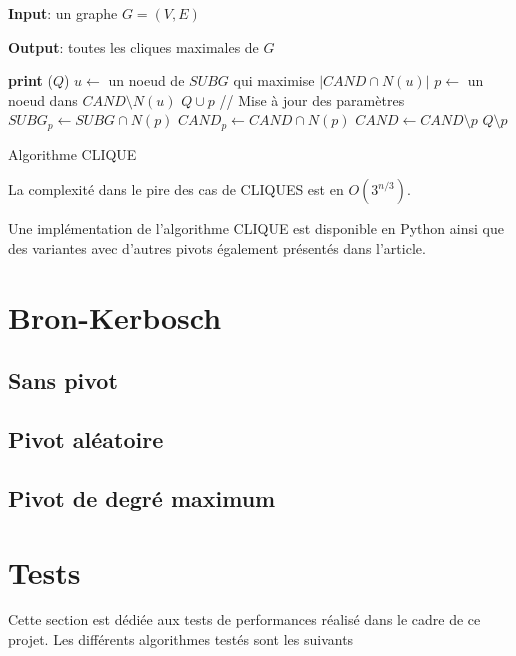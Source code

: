 \documentclass[12pt,a4paper]{article}
\begin{document}
\begin{algorithm}[H]
  \textbf{Input}: un graphe $G = (V,E)$

  \textbf{Output}: toutes les cliques maximales de $G$
  \begin{algorithmic}[1]
       
        \State \textbf{print} ($ Q $)
      \Else
        \State $u \gets$ un noeud de $SUBG$ qui maximise $|CAND \cap N(u)|$
          \State $p \gets$ un noeud dans $CAND \setminus N(u)$
          \State $ Q \cup p $ 
          \State // Mise à jour des paramètres
          \State $SUBG_p \gets SUBG \cap N(p)$
          \State $CAND_p \gets CAND \cap N(p)$
          \State {}
          \State $CAND \gets CAND \setminus {p}$
          \State $ Q \setminus p $ 
        \EndWhile
      \EndIf
    \EndProcedure
    \State {}
  \end{algorithmic}
  \caption{\label{fig:cliques} Algorithme CLIQUE}
\end{algorithm}

La complexité dans le pire des cas de CLIQUES est en $ O(3^{n/3}) $\cite{CONTE20221}.

Une implémentation de l'algorithme CLIQUE est disponible en Python ainsi que des variantes avec d'autres pivots également présentés dans l'article.

\section{Bron-Kerbosch}%
\label{sec:bk1}

\subsection{Sans pivot}%
\label{subsec:bk}

\subsection{Pivot aléatoire}%
\label{subsec:random}

\subsection{Pivot de degré maximum}%
\label{subsec:max}


\section{Tests}%
\label{sec:tests}
Cette section est dédiée aux tests de performances réalisé dans le cadre de ce projet. Les différents algorithmes testés sont les suivants
\end{document}
